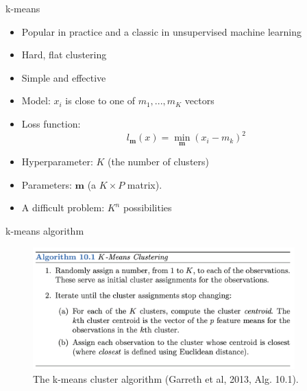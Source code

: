 \documentclass[10pt]{beamer}
\begin{document}
\begin{frame}{k-means}
\begin{itemize}
\item Popular in practice and a classic in unsupervised machine learning\pause
\item Hard, flat clustering
\item Simple and effective\pause
\item {\color{uured} Model}: $x_i$ is close to one of $m_1,...,m_K$ vectors
\item {\color{uured} Loss function}:
\[
l_\mathbf{m} (x) = \min_\mathbf{m} (x_i - m_k)^2
\]
\pause
\item {\color{uured} Hyperparameter}: $K$ (the number of clusters)
\item {\color{uured} Parameters}:  $\mathbf{m}$ (a $K \times P$ matrix).
\pause
\item A {\color{uured} difficult} problem: $K^n$ possibilities
\end{itemize}

\end{frame}


\begin{frame}{k-means algorithm}

\begin{figure}[h]
\centering
\includegraphics[width=0.9\textwidth]{fig/algo_10_1_kmeans.png}
\caption{The k-means cluster algorithm (Garreth et al, 2013, Alg. 10.1).}
\end{figure}


\end{frame}
\end{document}
